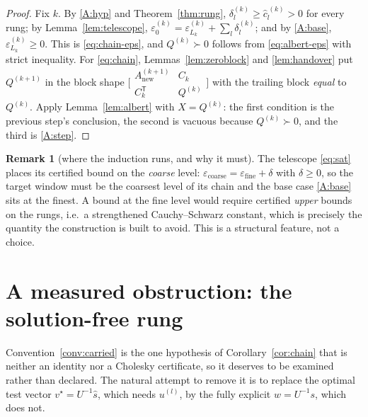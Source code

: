 \documentclass[11pt,a4paper]{article}
\theoremstyle{plain}
\theoremstyle{definition}
\newtheorem{remark}[theorem]{Remark}
\newcommand{\T}{\mathsf{T}}
\newcommand{\shat}{\widehat{s}}
\newcommand{\PD}{\succ 0}
\begin{document}
\begin{proof}
Fix $k$. By \ref{A:hyp} and Theorem~\ref{thm:rung}, $\delta^{(k)}_{l}\ge
\widehat c^{\,(k)}_{l}>0$ for every rung; by Lemma~\ref{lem:telescope},
$\varepsilon^{(k)}_{0}=\varepsilon^{(k)}_{L_{k}}+\sum_{l}\delta^{(k)}_{l}$; and by
\ref{A:base}, $\varepsilon^{(k)}_{L_{k}}\ge0$. This is \eqref{eq:chain-eps}, and
$Q^{(k)}\PD$ follows from \eqref{eq:albert-eps} with strict inequality.
For \eqref{eq:chain}, Lemmas~\ref{lem:zeroblock} and \ref{lem:handover} put
$Q^{(k+1)}$ in the block shape
$\bigl[\begin{smallmatrix}A^{(k+1)}_{\mathrm{new}}&C_{k}\\
 C_{k}^{\T}&Q^{(k)}\end{smallmatrix}\bigr]$
with the trailing block \emph{equal} to $Q^{(k)}$. Apply Lemma~\ref{lem:albert} with
$X=Q^{(k)}$: the first condition is the previous step's conclusion, the second is
vacuous because $Q^{(k)}\PD$, and the third is \ref{A:step}.
\end{proof}

\begin{remark}[where the induction runs, and why it must]
\label{rem:direction2}
The telescope \eqref{eq:sat} places its certified bound on the \emph{coarse} level:
$\varepsilon_{\text{coarse}}=\varepsilon_{\text{fine}}+\delta$ with $\delta\ge0$, so
the target window must be the coarsest level of its chain and the base case
\ref{A:base} sits at the finest. A bound at the fine level would require certified
\emph{upper} bounds on the rungs, i.e.\ a strengthened Cauchy--Schwarz constant, which
is precisely the quantity the construction is built to avoid. This is a structural
feature, not a choice.
\end{remark}

\section{A measured obstruction: the solution-free rung}
\label{sec:negative}

Convention~\ref{conv:carried} is the one hypothesis of Corollary~\ref{cor:chain} that
is neither an identity nor a Cholesky certificate, so it deserves to be examined
rather than declared. The natural attempt to remove it is to replace the optimal test
vector $v^{\star}=U^{-1}\shat$, which needs $u^{(l)}$, by the fully explicit
$w=U^{-1}s$, which does not.
\end{document}
